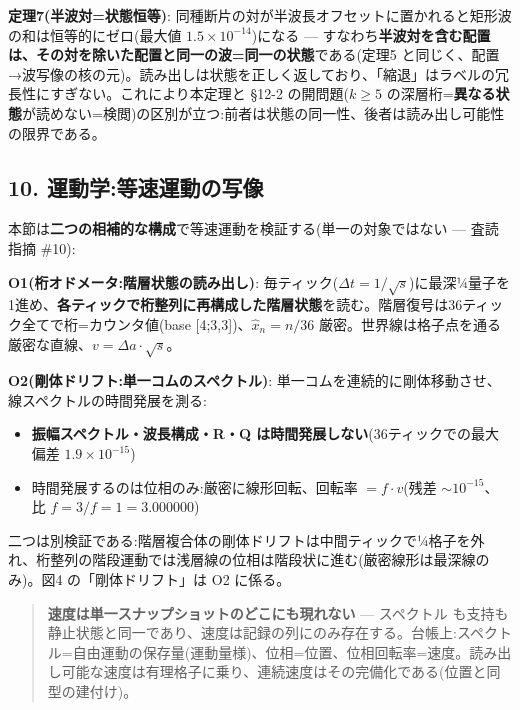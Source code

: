 \documentclass[
]{ltjsarticle}
\providecommand{\tightlist}{%
  \setlength{\itemsep}{0pt}\setlength{\parskip}{0pt}}
\begin{document}
\textbf{定理7(半波対=状態恒等)}:
同種断片の対が半波長オフセットに置かれると矩形波の和は恒等的にゼロ(最大値
\(1.5\times10^{-14}\))になる ---
すなわち\textbf{半波対を含む配置は、その対を除いた配置と同一の波=同一の状態}である(定理5
と同じく、配置→波写像の核の元)。読み出しは状態を正しく返しており、「縮退」はラベルの冗長性にすぎない。これにより本定理と
§12-2 の開問題(\(k\ge5\)
の深層桁=\textbf{異なる状態}が読めない=検閲)の区別が立つ:前者は状態の同一性、後者は読み出し可能性の限界である。

\subsection{10.
運動学:等速運動の写像}\label{ux904bux52d5ux5b66ux7b49ux901fux904bux52d5ux306eux5199ux50cf}

本節は\textbf{二つの相補的な構成}で等速運動を検証する(単一の対象ではない
--- 査読指摘 \#10):

\textbf{O1(桁オドメータ:階層状態の読み出し)}:
毎ティック(\(\Delta t=1/\sqrt s\))に最深¼量子を1進め、\textbf{各ティックで桁整列に再構成した階層状態}を読む。階層復号は36ティック全てで桁=カウンタ値(base
{[}4;3,3{]})、\(\hat x_n=n/36\)
厳密。世界線は格子点を通る厳密な直線、\(v=\Delta a\cdot\sqrt s\)。

\textbf{O2(剛体ドリフト:単一コムのスペクトル)}:
単一コムを連続的に剛体移動させ、線スペクトルの時間発展を測る:

\begin{itemize}
\tightlist
\item
  \textbf{振幅スペクトル・波長構成・R・Q
  は時間発展しない}(36ティックでの最大偏差 \(1.9\times10^{-15}\))
\item
  時間発展するのは位相のみ:厳密に線形回転、回転率 \(=f\cdot v\)(残差
  \(\sim10^{-15}\)、比 \(f{=}3/f{=}1=3.000000\))
\end{itemize}

二つは別検証である:階層複合体の剛体ドリフトは中間ティックで¼格子を外れ、桁整列の階段運動では浅層線の位相は階段状に進む(厳密線形は最深線のみ)。図4
の「剛体ドリフト」は O2 に係る。

\begin{quote}
\textbf{速度は単一スナップショットのどこにも現れない} ---
\textbar スペクトル\textbar{}
も支持も静止状態と同一であり、速度は記録の列にのみ存在する。台帳上:\textbar スペクトル\textbar=自由運動の保存量(運動量様)、位相=位置、位相回転率=速度。読み出し可能な速度は有理格子に乗り、連続速度はその完備化である(位置と同型の建付け)。
\end{quote}
\end{document}
